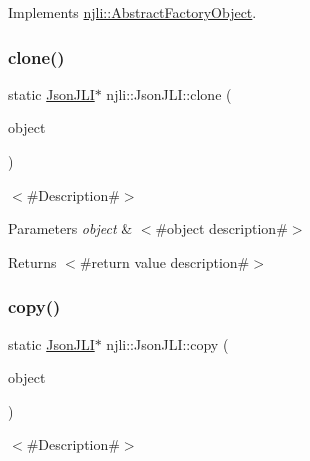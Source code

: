 Implements \mbox{\hyperlink{classnjli_1_1_abstract_factory_object_a4763d05bc9dc37c559111f8bb30e1dd8}{njli\+::\+Abstract\+Factory\+Object}}.

\mbox{\label{classnjli_1_1_json_j_l_i_a32601c2f880363f7e97de754258a007f}} 
\subsubsection{\texorpdfstring{clone()}{clone()}}
{\footnotesize\ttfamily static \mbox{\hyperlink{classnjli_1_1_json_j_l_i}{Json\+J\+LI}}$\ast$ njli\+::\+Json\+J\+L\+I\+::clone (\begin{DoxyParamCaption}\item[{const \mbox{\hyperlink{classnjli_1_1_json_j_l_i}{Json\+J\+LI}} \&}]{object }\end{DoxyParamCaption})\hspace{0.3cm}{\ttfamily [static]}}

$<$\#\+Description\#$>$


\begin{DoxyParams}{Parameters}
{\em object} & $<$\#object description\#$>$\\
\hline
\end{DoxyParams}
\begin{DoxyReturn}{Returns}
$<$\#return value description\#$>$ 
\end{DoxyReturn}
\mbox{\label{classnjli_1_1_json_j_l_i_a2a4d8899495a335c9c734e090dbaf6b0}} 
\subsubsection{\texorpdfstring{copy()}{copy()}}
{\footnotesize\ttfamily static \mbox{\hyperlink{classnjli_1_1_json_j_l_i}{Json\+J\+LI}}$\ast$ njli\+::\+Json\+J\+L\+I\+::copy (\begin{DoxyParamCaption}\item[{const \mbox{\hyperlink{classnjli_1_1_json_j_l_i}{Json\+J\+LI}} \&}]{object }\end{DoxyParamCaption})\hspace{0.3cm}{\ttfamily [static]}}

$<$\#\+Description\#$>$



